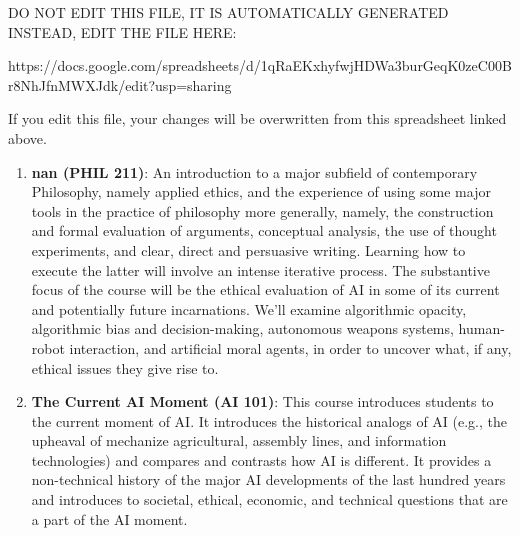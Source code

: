 
DO NOT EDIT THIS FILE, IT IS AUTOMATICALLY GENERATED
INSTEAD, EDIT THE FILE HERE:

https://docs.google.com/spreadsheets/d/1qRaEKxhyfwjHDWa3burGeqK0zeC00Br8NhJfnMWXJdk/edit?usp=sharing

If you edit this file, your changes will be overwritten from this spreadsheet
linked above.

\begin{enumerate}
\item \textbf{nan (PHIL 211)}: An introduction to a major subfield of contemporary Philosophy, namely applied ethics, and the experience of using some major tools in the practice of philosophy more generally, namely, the construction and formal evaluation of arguments, conceptual analysis, the use of thought experiments, and clear, direct and persuasive writing. Learning how to execute the latter will involve an intense iterative process.
The substantive focus of the course will be the ethical evaluation of AI in some of its current and potentially future incarnations. We’ll examine algorithmic opacity, algorithmic bias
and decision-making, autonomous weapons systems, human-robot interaction, and artificial
moral agents, in order to uncover what, if any, ethical issues they give rise to.
\item \textbf{The Current AI Moment (AI 101)}: This course introduces students to the current moment of AI.  It introduces the historical analogs of AI (e.g., the upheaval of mechanize agricultural, assembly lines, and information technologies) and compares and contrasts how AI is different.  It provides a non-technical history of the major AI developments of the last hundred years and introduces to societal, ethical, economic, and technical questions that are a part of the AI moment.
\end{enumerate}